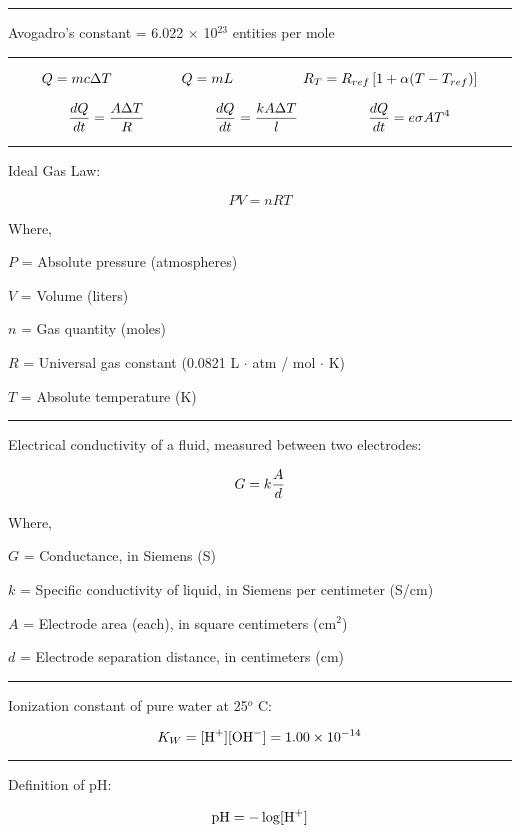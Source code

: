 

\vskip 5pt
\hrule
\vskip 5pt

\noindent
Avogadro's constant = 6.022 $\times$ 10$^{23}$ entities per mole

\vskip 5pt
\hrule
\vskip 5pt

$$Q = mc \Delta T \hskip 50 pt Q = mL \hskip 50pt R_T = R_{ref} \left[1 + \alpha (T - T_{ref}) \right]$$

$${dQ \over dt} = {{A \Delta T} \over R} \hskip 50pt {dQ \over dt} = {{k A \Delta T} \over l} \hskip 50pt {dQ \over dt} = e \sigma A T^4$$

\vskip 5pt
\hrule
\vskip 5pt


\noindent
Ideal Gas Law: 

$$PV = nRT$$

\noindent
Where,

$P$ = Absolute pressure (atmospheres)

$V$ = Volume (liters)

$n$ = Gas quantity (moles)

$R$ = Universal gas constant (0.0821 L $\cdot$ atm / mol $\cdot$ K)

$T$ = Absolute temperature (K)


\vskip 5pt
\hrule
\vskip 5pt

\noindent
Electrical conductivity of a fluid, measured between two electrodes:

$$G = k{A \over d}$$

\noindent
Where,

$G$ = Conductance, in Siemens (S)

$k$ = Specific conductivity of liquid, in Siemens per centimeter (S/cm)

$A$ = Electrode area (each), in square centimeters (cm$^{2}$)

$d$ = Electrode separation distance, in centimeters (cm)

\vskip 5pt
\hrule
\vskip 5pt

\noindent
Ionization constant of pure water at 25$^{o}$ C:

$$K_W = [\hbox{H}^{+}] [\hbox{OH}^{-}] = 1.00 \times 10^{-14}$$ 

\vskip 5pt
\hrule
\vskip 5pt

\noindent
Definition of pH:

$$\hbox{pH} = - \log [\hbox{H}^{+}]$$

